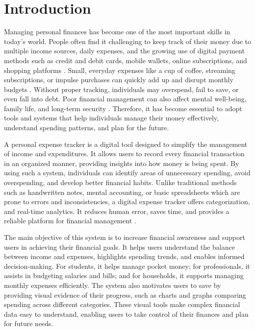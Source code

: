 \documentclass[12pt]{report} %
\begin{document}
\chapter{Introduction}
\justifying
Managing personal finances has become one of the most important skills in today's world.
People often find it challenging to keep track of their money due to multiple income
sources, daily expenses, and the growing use of digital payment methods such as credit and
debit cards, mobile wallets, online subscriptions, and shopping platforms \cite{singh2021spending}. Small, everyday
expenses like a cup of coffee, streaming subscriptions, or impulse purchases can quickly add
up and disrupt monthly budgets \cite{chandini2019online}. Without proper tracking, individuals may overspend, fail
to save, or even fall into debt. Poor financial management can also affect mental well-being,
family life, and long-term security \cite{verma2024research}. Therefore, it has become essential to adopt tools and
systems that help individuals manage their money effectively, understand spending patterns,
and plan for the future.

A personal expense tracker is a digital tool designed to simplify the management of income 
and expenditures. It allows users to record every financial transaction in an organized
manner, providing insights into how money is being spent. By using such a system, individuals
can identify areas of unnecessary spending, avoid overspending, and develop better
financial habits. Unlike traditional methods such as handwritten notes, mental accounting,
or basic spreadsheets which are prone to errors and inconsistencies, a digital expense tracker
offers categorization, and real-time analytics. It reduces human error, saves
time, and provides a reliable platform for financial management \cite{verma2024research}.

The main objective of this system is to increase financial awareness and support users in
achieving their financial goals. It helps users understand the balance between income and
expenses, highlights spending trends, and enables informed decision-making. For students,
it helps manage pocket money; for professionals, it assists in budgeting salaries and bills;
and for households, it supports managing monthly expenses efficiently. The system also
motivates users to save by providing visual evidence of their progress, such as charts and
graphs comparing spending across different categories. These visual tools make complex
financial data easy to understand, enabling users to take control of their finances and plan
for future needs.
\end{document}
